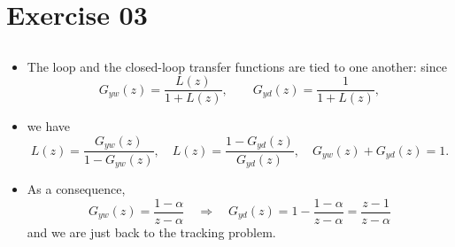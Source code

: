 \section{Exercise 03}
\subsection{}

\begin{frame}
\myPause
 \begin{itemize}[<+-| alert@+>]
 \item The loop  and the closed-loop transfer functions are tied to one another: since
       \begin{displaymath}
        G_{yw}(z) = \frac{L(z)}{1+L(z)}, \qquad
        G_{yd}(z) = \frac{1}{1+L(z)},
       \end{displaymath}
 \item we have
       \begin{displaymath}
         L(z) = \frac{G_{yw}(z)}{1-G_{yw}(z)}, \quad
         L(z) = \frac{1-G_{yd}(z)}{G_{yd}(z)}, \quad
         G_{yw}(z)+G_{yd}(z) = 1.
       \end{displaymath}
 \item As a consequence,
       \begin{displaymath}
        G_{yw}(z) = \frac{1-\alpha}{z-\alpha} \quad \Rightarrow \quad
        G_{yd}(z) = 1-\frac{1-\alpha}{z-\alpha}
                  = \frac{z-1}{z-\alpha}
       \end{displaymath}
       and we are just back to the tracking problem.
 \end{itemize}
\end{frame}

